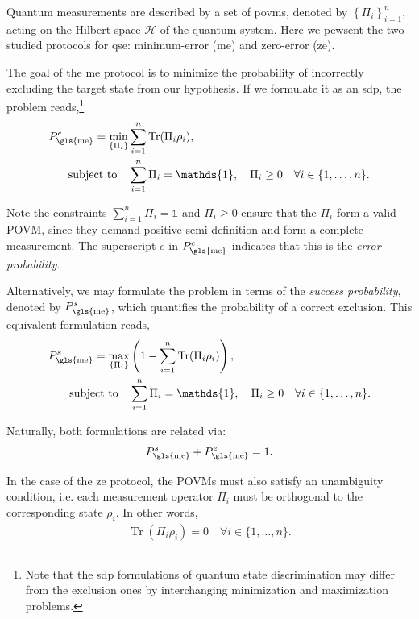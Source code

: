 \documentclass[12pt,letterpaper]{article}
\DeclareMathOperator{\tr}{Tr}
\begin{document}
\begin{multicols}{2}
Quantum measurements are described by a set of \glspl{povm}, denoted by $\left\{\Pi_i\right\}_{i=1}^n$, acting on the Hilbert space $\mathcal{H}$ of the quantum system. Here we pewsent the two studied protocols for \gls{qse}: minimum-error (\gls{me}) and zero-error (\gls{ze}).

The goal of the \gls{me} protocol is to minimize the probability of incorrectly excluding the target state from our hypothesis. If we formulate it as an \gls{sdp}, the problem reads,\footnote{Note that the \gls{sdp} formulations of quantum state discrimination may differ from the exclusion ones by interchanging minimization and maximization problems.}
\begin{align*}
	P_{\text{\gls{me}}}^e = \min_{\left\{\Pi_i\right\}} &\sum_{i=1}^n \tr(\Pi_i \rho_i),\\
	\text{subject to} \quad & \sum_{i=1}^n \Pi_i = \mathds{1}, \quad \Pi_i \geq 0 \quad \forall i \in \{1, \dots, n\}.
\end{align*}

Note the constraints $\sum_{i=1}^n \Pi_i = \mathds{1}$ and $\Pi_i \geq 0$ ensure that the $\Pi_i$ form a valid POVM, since they demand positive semi-definition and form a complete measurement. The superscript $e$ in $P_{\text{\gls{me}}}^e$ indicates that this is the \emph{error probability}.

Alternatively, we may formulate the problem in terms of the \emph{success probability}, denoted by $P_{\text{\gls{me}}}^s$, which quantifies the probability of a correct exclusion. This equivalent formulation reads,
\begin{align*}
	P_{\text{\gls{me}}}^s = \max_{\left\{\Pi_i\right\}} &\left(1 - \sum_{i=1}^n \tr(\Pi_i \rho_i)\right),\\
	\text{subject to} \quad & \sum_{i=1}^n \Pi_i = \mathds{1}, \quad \Pi_i \geq 0 \quad \forall i \in \{1, \dots, n\}.
\end{align*}

Naturally, both formulations are related via:
\begin{align*}
P_{\text{\gls{me}}}^s + P_{\text{\gls{me}}}^e = 1.
\end{align*}

In the case of the \gls{ze} protocol, the POVMs must also satisfy an unambiguity condition, i.e. each measurement operator $\Pi_i$ must be orthogonal to the corresponding state $\rho_i$. In other words,
\begin{align*}
\tr(\Pi_i \rho_i) = 0 \quad \forall i \in \{1, \dots, n\}.
\end{align*}


\end{multicols}
\end{document}
